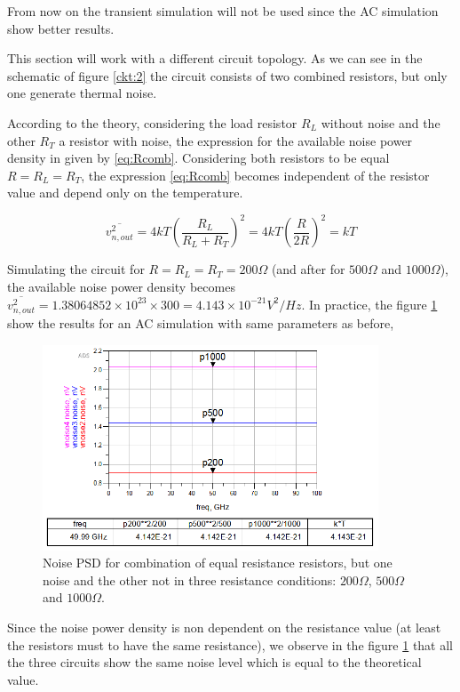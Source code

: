 From now on the transient simulation will not be used since the AC simulation show better results.

This section will work with a different circuit topology. As we can see in the schematic of figure \ref{ckt:2} the circuit consists of two combined resistors, but only one generate thermal noise.



According to the theory, considering the load resistor $R_L$ without noise and the other $R_T$ a resistor with noise, the expression for the available noise power density in given by \ref{eq:Rcomb}. Considering both resistors to be equal $R = R_L = R_T$, the expression \ref{eq:Rcomb} becomes independent of the resistor value and depend only on the temperature.

\begin{equation} \label{eq:Rcomb}
    \overline{v_{n,out}^2} = 4kT \left(\frac{R_L}{R_L+R_T} \right)^2 =  4kT \left(\frac{R}{2R} \right)^2 = kT
\end{equation}

Simulating the circuit for $R=R_L=R_T= 200 \Omega$ (and after for $500 \Omega$ and $1000 \Omega$), the available noise power density becomes $\overline{v_{n,out}^2} = 1.38064852 \times 10^{23} \times 300 = 4.143 \times 10^{-21} V^2/Hz$. In practice, the figure \ref{fig:ac2} show the results for an AC simulation with same parameters as before,  

\begin{figure}[H] 
\centering
\includegraphics[width=10cm]{images/pnoise.png}
\caption{Noise PSD for combination of equal resistance resistors, but one noise and the other not in three resistance conditions: $200 \Omega$, $500 \Omega$ and $1000 \Omega$.}
\label{fig:ac2} 
\end{figure}

Since the noise power density is non dependent on the resistance value (at least the resistors must to have the same resistance), we observe in the figure \ref{fig:ac2} that all the three circuits show the same noise level which is equal to the theoretical value.


